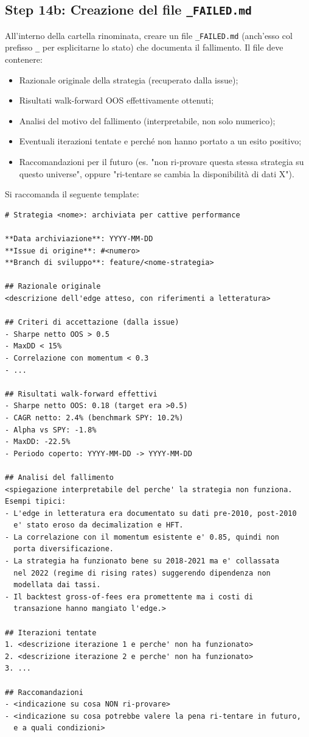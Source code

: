 \subsection{Step 14b: Creazione del file \texttt{\_FAILED.md}}

All'interno della cartella rinominata, creare un file \texttt{\_FAILED.md} (anch'esso col prefisso \texttt{\_} per esplicitarne lo stato) che documenta il fallimento. Il file deve contenere:

\begin{itemize}
  \item Razionale originale della strategia (recuperato dalla issue);
  \item Risultati walk-forward OOS effettivamente ottenuti;
  \item Analisi del motivo del fallimento (interpretabile, non solo numerico);
  \item Eventuali iterazioni tentate e perché non hanno portato a un esito positivo;
  \item Raccomandazioni per il futuro (es. "non ri-provare questa stessa strategia su questo universe", oppure "ri-tentare se cambia la disponibilità di dati X").
\end{itemize}

Si raccomanda il seguente template:

\begin{lstlisting}
# Strategia <nome>: archiviata per cattive performance

**Data archiviazione**: YYYY-MM-DD
**Issue di origine**: #<numero>
**Branch di sviluppo**: feature/<nome-strategia>

## Razionale originale
<descrizione dell'edge atteso, con riferimenti a letteratura>

## Criteri di accettazione (dalla issue)
- Sharpe netto OOS > 0.5
- MaxDD < 15%
- Correlazione con momentum < 0.3
- ...

## Risultati walk-forward effettivi
- Sharpe netto OOS: 0.18 (target era >0.5)
- CAGR netto: 2.4% (benchmark SPY: 10.2%)
- Alpha vs SPY: -1.8%
- MaxDD: -22.5%
- Periodo coperto: YYYY-MM-DD -> YYYY-MM-DD

## Analisi del fallimento
<spiegazione interpretabile del perche' la strategia non funziona.
Esempi tipici:
- L'edge in letteratura era documentato su dati pre-2010, post-2010
  e' stato eroso da decimalization e HFT.
- La correlazione con il momentum esistente e' 0.85, quindi non
  porta diversificazione.
- La strategia ha funzionato bene su 2018-2021 ma e' collassata
  nel 2022 (regime di rising rates) suggerendo dipendenza non
  modellata dai tassi.
- Il backtest gross-of-fees era promettente ma i costi di
  transazione hanno mangiato l'edge.>

## Iterazioni tentate
1. <descrizione iterazione 1 e perche' non ha funzionato>
2. <descrizione iterazione 2 e perche' non ha funzionato>
3. ...

## Raccomandazioni
- <indicazione su cosa NON ri-provare>
- <indicazione su cosa potrebbe valere la pena ri-tentare in futuro,
  e a quali condizioni>
\end{lstlisting}

